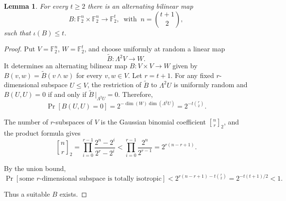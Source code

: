 \documentclass[a4paper,11pt]{amsart}
\newtheorem{lem}[lem]{Lemma}
\theoremstyle{definition}
\newcommand{\F}{\mathbb F}
\begin{document}
\begin{lem}\label{lem:random-isotropic}
For every $t\ge2$ there is an alternating bilinear map
\[
 B:\F_2^n\times\F_2^n\rightarrow\F_2^t,
 \ \text{ with }\ n=\binom{t+1}{2},
\]
such that $\iota(B)\le t$.
\end{lem}
\begin{proof}
Put $V=\F_2^n$, $W=\F_2^t$, and choose uniformly at random a linear map
\[
 \widetilde B:\Lambda^2V\rightarrow W.
\]
It determines an alternating bilinear map $B:V\times V\rightarrow W$ given by $B(v,w)=\widetilde B(v\wedge w)$ for every $v,w\in V$.  Let $r=t+1$.  For any fixed
$r$-dimensional subspace $U\le V$, the restriction of $\widetilde B$ to
$\Lambda^2U$ is uniformly random and $B(U,U)=0$ if and only if $\widetilde B \,\big|_{\Lambda^2U}=0$. Therefore,
\[
 \Pr[B(U,U)=0]=2^{-\dim(W)\dim(\Lambda^2U)}=2^{-t\binom r2}.
\]


 The number of $r$-subspaces of $V$ is the Gaussian binomial coefficient
$\genfrac{[}{]}{0pt}{}{n}{r}_2$, and the product formula gives
\[
 \genfrac{[}{]}{0pt}{}{n}{r}_2=\prod_{i=0}^{r-1}\frac{2^n-2^i}{2^r-2^i}<\prod_{i=0}^{r-1}\frac{2^n}{2^{r-1}}=2^{r(n-r+1)}.
\]

By the union bound,
\[
 \Pr[\text{some $r$-dimensional subspace is totally isotropic}]
 <2^{r(n-r+1)-t\binom r2}
 =2^{-t(t+1)/2}<1.
\]

Thus a suitable $B$ exists.
\end{proof}
\end{document}
